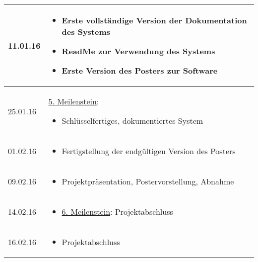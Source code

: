 \documentclass{scrartcl}
\begin{document}
\begin{longtable}{| l | p{14cm} |}
\hline
11.01.16 & \begin{itemize}
 \item Erste vollständige Version der Dokumentation des Systems
 \item ReadMe zur Verwendung des Systems
 \item Erste Version des Posters zur Software
\end{itemize}\\
\hline
25.01.16 & \underline{5. Meilenstein}: \begin{itemize}
 \item Schlüsselfertiges, dokumentiertes System 
\end{itemize}\\
\hline
01.02.16 & \begin{itemize}
 \item Fertigstellung der endgültigen Version des Posters
\end{itemize}\\
\hline
09.02.16 & \begin{itemize}
 \item Projektpräsentation, Postervorstellung, Abnahme
\end{itemize}\\
\hline
14.02.16 & \begin{itemize}
 \item \underline{6. Meilenstein}: Projektabschluss
\end{itemize}\\
\hline
16.02.16 & \begin{itemize}
 \item Projektabschluss
\end{itemize}\\
\hline
\end{longtable}
\end{document}

